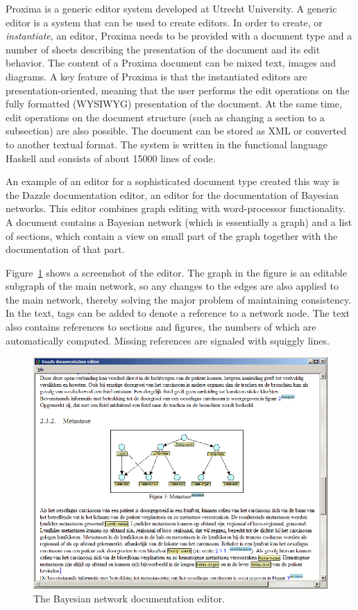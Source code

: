 \documentclass[10pt]{article}
\begin{document}
Proxima is a generic editor system developed at Utrecht University. A generic editor is a system that can be used to create editors. In order to create, or {\em instantiate}, an editor, Proxima needs to be provided with a document type and a number of sheets describing the presentation of the document and its edit behavior. The content of a Proxima document can be mixed text, images and diagrams. A key feature of Proxima is that the instantiated editors are presentation-oriented, meaning that the user performs the edit operations on the fully formatted (WYSIWYG) presentation of the document. At the same time, edit operations on the document structure (such as changing a section to a subsection) are also possible. The document can be stored as XML or converted to another textual format. The system is written in the functional language Haskell and consists of about 15000 lines of code.

An example of an editor for a sophisticated document type created this way is the Dazzle documentation editor, an editor for the documentation of Bayesian networks. This editor combines graph editing with word-processor functionality. A document contains a Bayesian network (which is essentially a graph) and a list of sections, which contain a view on small part of the graph together with the documentation of that part. 

Figure~\ref{fig:bayesDocEditor} shows a screenshot of the editor. The graph in the figure is an editable subgraph of the main network, so any changes to the edges are also applied to the main network, thereby solving the major problem of maintaining consistency. In the text, tags can be added to denote a reference to a network node. The text also contains references to sections and figures, the numbers of which are automatically computed. Missing references are signaled with squiggly lines.

\begin{figure}[t]
\begin{center}
\includegraphics[width=12cm]{images/subgraph}
\end{center}
\caption{The Bayesian network documentation editor.}
\label{fig:bayesDocEditor}
\end{figure}
\end{document}
